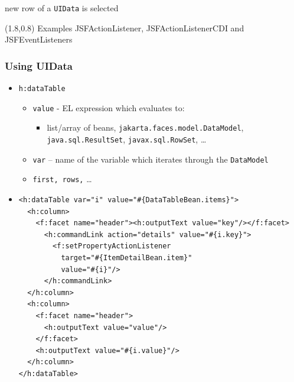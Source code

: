 \documentclass[10pt,xcolor=pdflatex]{beamer}
\begin{document}
\begin{frame}[fragile]
\begin{itemize}
          \begin{itemize}
          \end{itemize}
	\end{itemize}
\begin{textblock}{20}(1.8,0.8)
    {\footnotesize Examples JSFActionListener, JSFActionListenerCDI and JSFEventListeners}
\end{textblock}
\end{frame}


\begin{frame}[fragile]\frametitle{Using UIData}
	\begin{itemize}
      \item \texttt{h:dataTable}
        \begin{itemize}
          \item \texttt{value} - EL expression which evaluates to:
            \begin{itemize}
              \item list/array of beans, \texttt{jakarta.faces.model.DataModel}, \texttt{java.sql.ResultSet}, \texttt{javax.sql.RowSet}, \ldots
            \end{itemize}
          \item \texttt{var} -- name of the variable which iterates through the \texttt{DataModel}
          \item \texttt{first, rows,} \ldots
        \end{itemize}
      \vspace{.25cm}
	\item[]
   		\begin{footnotesize}
    		\begin{verbatim}
<h:dataTable var="i" value="#{DataTableBean.items}">
  <h:column>
    <f:facet name="header"><h:outputText value="key"/></f:facet>
      <h:commandLink action="details" value="#{i.key}">
        <f:setPropertyActionListener 
          target="#{ItemDetailBean.item}"
          value="#{i}"/>
      </h:commandLink>
  </h:column>
  <h:column>
    <f:facet name="header">
      <h:outputText value="value"/>
    </f:facet>
    <h:outputText value="#{i.value}"/>
  </h:column>
</h:dataTable>    
\end{verbatim}
   		\end{footnotesize}
	\end{itemize}
\end{frame}
\end{document}
